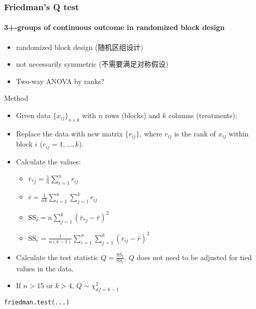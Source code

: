 \documentclass[table,10pt]{beamer}\usepackage[]{graphicx}\usepackage[]{color}
\begin{document}
\begin{CJK*}{UTF8}{gbsn}
\begin{frame}[t,containsverbatim]
\frametitle{Friedman's Q test}
\framesubtitle{3+-groups of continuous outcome in randomized block design}
\begin{itemize}
	\item randomized block design (随机区组设计)
	\item not necessarily symmetric (不需要满足对称假设)
	\item Two-way ANOVA by ranks?
\end{itemize}
\begin{block}{\center \small Method}
\begin{itemize}
\small
	\item Given data $\{x_{ij}\}_{n \times k}$ with $n$ rows (blocks) and $k$ columns (treatments);
	\item Replace the data with new matrix $\{r_{ij}\}$, where $r_{ij}$ is the rank of $x_{ij}$ within 
		block $i$ ($r_{ij}=1,\dots,k$).
	\item Calculate the values:
	\begin{itemize}
		\item $\bar{r}_{*j} = \frac{1}{n} \sum_{i=1}^n r_{ij}$
		\item $\bar{r} = \frac{1}{nk}\sum_{i=1}^n \sum_{j=1}^k r_{ij}$
		\item $\textrm{SS}_t = n \sum_{j=1}^k (\bar{r}_{*j} - \bar{r})^2$
		\item $\textrm{SS}_e = \frac{1}{n(k-1)} \sum_{i=1}^n \sum_{j=1}^k (r_{ij} - \bar{r})^2$
	\end{itemize}
	\item Calculate the test statistic $Q = \frac{\textrm{SS}_t}{\textrm{SS}_e}$. $Q$ does not need 
		to be adjusted for tied values in the data.
	\item If $n>15$ or $k>4$, $Q \sim \chi^2_{df=k-1}$
\end{itemize}
\end{block}
\begin{lstlisting}
friedman.test(...)
\end{lstlisting}
\end{frame}



\end{CJK*}
\end{document}
